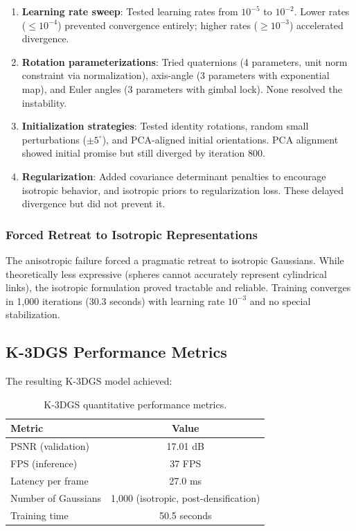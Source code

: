 \documentclass[12pt,a4paper,oneside]{report}
\begin{document}
\begin{enumerate}
    \item \textbf{Learning rate sweep}: Tested learning rates from $10^{-5}$ to $10^{-2}$. Lower rates ($\leq 10^{-4}$) prevented convergence entirely; higher rates ($\geq 10^{-3}$) accelerated divergence.
    \item \textbf{Rotation parameterizations}: Tried quaternions (4 parameters, unit norm constraint via normalization), axis-angle (3 parameters with exponential map), and Euler angles (3 parameters with gimbal lock). None resolved the instability.
    \item \textbf{Initialization strategies}: Tested identity rotations, random small perturbations ($\pm5^\circ$), and PCA-aligned initial orientations. PCA alignment showed initial promise but still diverged by iteration 800.
    \item \textbf{Regularization}: Added covariance determinant penalties to encourage isotropic behavior, and isotropic priors to regularization loss. These delayed divergence but did not prevent it.
\end{enumerate}

\subsubsection{Forced Retreat to Isotropic Representations}

The anisotropic failure forced a pragmatic retreat to isotropic Gaussians. While theoretically less expressive (spheres cannot accurately represent cylindrical links), the isotropic formulation proved tractable and reliable. Training converges in 1,000 iterations (30.3 seconds) with learning rate $10^{-3}$ and no special stabilization.

\subsection{K-3DGS Performance Metrics}

The resulting K-3DGS model achieved:

\begin{table}[H]
\centering
\caption{K-3DGS quantitative performance metrics.}
\label{tab:k3dgs_performance}
\begin{tabular}{lc}
\toprule
Metric & Value \\
\midrule
PSNR (validation) & 17.01 dB \\
FPS (inference) & 37 FPS \\
Latency per frame & 27.0 ms \\
Number of Gaussians & 1,000 (isotropic, post-densification) \\
Training time & 50.5 seconds \\
\bottomrule
\end{tabular}
\end{table}
\end{document}

